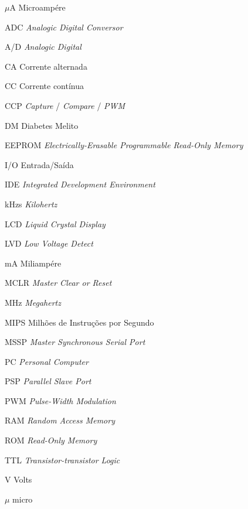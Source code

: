 \documentclass[	12pt, Times, openright, twoside, a4paper, english, brazil]{abntex2}
\begin{document}
\listoffigures*
\cleardoublepage

\listoftables*
\cleardoublepage

\begin{siglas}
  \item[$\mu$A] Microampére
  \item[ADC] \emph{Analogic Digital Conversor}
  \item[A/D] \emph{Analogic Digital}
  \item[CA] Corrente alternada
  \item[CC] Corrente contínua
  \item[CCP] \emph{Capture} / \emph{Compare} / \emph{PWM}
  \item[DM] Diabetes Melito
  \item[EEPROM] \emph{Electrically-Erasable Programmable Read-Only Memory}
  \item[I/O] Entrada/Saída
  \item[IDE] \emph{Integrated Development Environment}
  \item[kHzs] \emph{Kilohertz}
  \item[LCD] \emph{Liquid Crystal Display}
  \item[LVD] \emph{Low Voltage Detect}
  \item[mA] Miliampére
  \item[MCLR] \emph{Master Clear or Reset}
  \item[MHz] \emph{Megahertz}
  \item[MIPS] Milhões de Instruções por Segundo
  \item[MSSP] \emph{Master Synchronous Serial Port}
  \item[PC] \emph{Personal Computer}
  \item[PSP] \emph{Parallel Slave Port}
  \item[PWM] \emph{Pulse-Width Modulation}
  \item[RAM] \emph{Random Access Memory}          
  \item[ROM] \emph{Read-Only Memory}
  \item[TTL] \emph{Transistor-transistor Logic}
  \item[V] Volts  
\end{siglas}

\begin{simbolos}
  \item[$ \mu $] micro
\end{simbolos}
\end{document}
